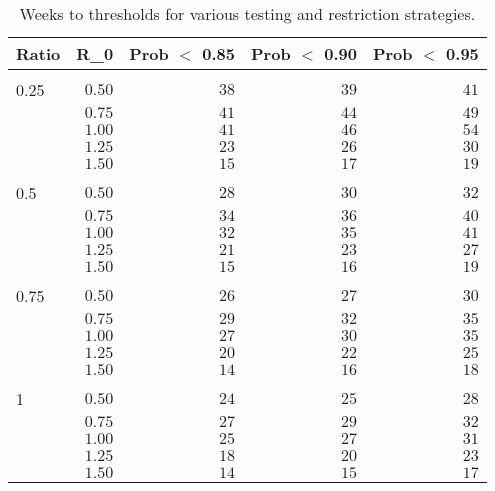 \begin{table}[tb]
\caption{Weeks to thresholds for various testing and restriction strategies.\label{tab:intervention}} 
\begin{center}
\begin{tabular}{lrrrr}
\hline\hline
\multicolumn{1}{c}{Ratio}&\multicolumn{1}{c}{R_0}&\multicolumn{1}{c}{Prob $<$ 0.85}&\multicolumn{1}{c}{Prob $<$ 0.90}&\multicolumn{1}{c}{Prob $<$ 0.95}\tabularnewline
\hline
&&&&\tabularnewline
0.25&$0.50$&$38$&$39$&$41$\tabularnewline
 &$0.75$&$41$&$44$&$49$\tabularnewline
 &$1.00$&$41$&$46$&$54$\tabularnewline
 &$1.25$&$23$&$26$&$30$\tabularnewline
 &$1.50$&$15$&$17$&$19$\tabularnewline
\hline
&&&&\tabularnewline
0.5&$0.50$&$28$&$30$&$32$\tabularnewline
 &$0.75$&$34$&$36$&$40$\tabularnewline
 &$1.00$&$32$&$35$&$41$\tabularnewline
 &$1.25$&$21$&$23$&$27$\tabularnewline
 &$1.50$&$15$&$16$&$19$\tabularnewline
\hline
&&&&\tabularnewline
0.75&$0.50$&$26$&$27$&$30$\tabularnewline
 &$0.75$&$29$&$32$&$35$\tabularnewline
 &$1.00$&$27$&$30$&$35$\tabularnewline
 &$1.25$&$20$&$22$&$25$\tabularnewline
 &$1.50$&$14$&$16$&$18$\tabularnewline
\hline
&&&&\tabularnewline
1&$0.50$&$24$&$25$&$28$\tabularnewline
 &$0.75$&$27$&$29$&$32$\tabularnewline
 &$1.00$&$25$&$27$&$31$\tabularnewline
 &$1.25$&$18$&$20$&$23$\tabularnewline
 &$1.50$&$14$&$15$&$17$\tabularnewline
\hline
\end{tabular}\end{center}
\end{table}
